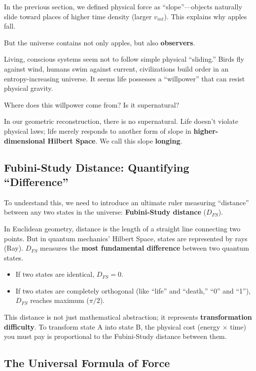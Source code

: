 \documentclass[11pt,a4paper,twoside]{book}
\begin{document}
In the previous section, we defined physical force as ``slope''---objects naturally slide toward places of higher time density (larger $v_{int}$). This explains why apples fall.

But the universe contains not only apples, but also \textbf{observers}.

Living, conscious systems seem not to follow simple physical ``sliding.'' Birds fly against wind, humans swim against current, civilizations build order in an entropy-increasing universe. It seems life possesses a ``willpower'' that can resist physical gravity.

Where does this willpower come from? Is it supernatural?

In our geometric reconstruction, there is no supernatural. Life doesn't violate physical laws; life merely responds to another form of slope in \textbf{higher-dimensional Hilbert Space}. We call this slope \textbf{longing}.

\subsection{Fubini-Study Distance: Quantifying ``Difference''}

To understand this, we need to introduce an ultimate ruler measuring ``distance'' between any two states in the universe: \textbf{Fubini-Study distance} ($D_{FS}$).

In Euclidean geometry, distance is the length of a straight line connecting two points. But in quantum mechanics' Hilbert Space, states are represented by rays (Ray). $D_{FS}$ measures the \textbf{most fundamental difference} between two quantum states.

\begin{itemize}
\item If two states are identical, $D_{FS} = 0$.

\item If two states are completely orthogonal (like ``life'' and ``death,'' ``0'' and ``1''), $D_{FS}$ reaches maximum ($\pi/2$).
\end{itemize}

This distance is not just mathematical abstraction; it represents \textbf{transformation difficulty}. To transform state A into state B, the physical cost (energy $\times$ time) you must pay is proportional to the Fubini-Study distance between them.

\subsection{The Universal Formula of Force}
\end{document}

